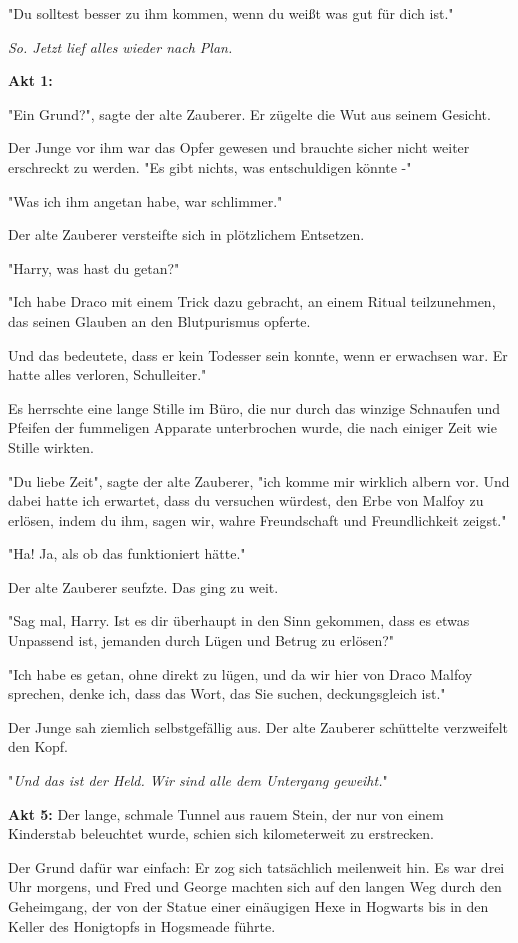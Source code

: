 {"Du solltest besser zu ihm kommen, wenn du weißt was gut für dich ist."

\emph{So. Jetzt lief alles wieder nach Plan.}

\textbf{Akt 1:}

"Ein Grund?", sagte der alte Zauberer. Er zügelte die Wut aus seinem Gesicht.

Der Junge vor ihm war das Opfer gewesen und brauchte sicher nicht weiter erschreckt zu werden. "Es gibt nichts, was entschuldigen könnte -"

"Was ich ihm angetan habe, war schlimmer."

Der alte Zauberer versteifte sich in plötzlichem Entsetzen.

"Harry, was hast du getan?"

"Ich habe Draco mit einem Trick dazu gebracht, an einem Ritual teilzunehmen, das seinen Glauben an den Blutpurismus opferte.

Und das bedeutete, dass er kein Todesser sein konnte, wenn er erwachsen war. Er hatte alles verloren, Schulleiter."

Es herrschte eine lange Stille im Büro, die nur durch das winzige Schnaufen und Pfeifen der fummeligen Apparate unterbrochen wurde, die nach einiger Zeit wie Stille wirkten.

"Du liebe Zeit", sagte der alte Zauberer, "ich komme mir wirklich albern vor. Und dabei hatte ich erwartet, dass du versuchen würdest, den Erbe von Malfoy zu erlösen, indem du ihm, sagen wir, wahre Freundschaft und Freundlichkeit zeigst."

"Ha! Ja, als ob das funktioniert hätte."

Der alte Zauberer seufzte. Das ging zu weit.

"Sag mal, Harry. Ist es dir überhaupt in den Sinn gekommen, dass es etwas Unpassend ist, jemanden durch Lügen und Betrug zu erlösen?"

"Ich habe es getan, ohne direkt zu lügen, und da wir hier von Draco Malfoy sprechen, denke ich, dass das Wort, das Sie suchen, deckungsgleich ist."

Der Junge sah ziemlich selbstgefällig aus. Der alte Zauberer schüttelte verzweifelt den Kopf.

"\emph{Und das ist der Held. Wir sind alle dem Untergang geweiht.}"

\textbf{Akt 5:} Der lange, schmale Tunnel aus rauem Stein, der nur von einem Kinderstab beleuchtet wurde, schien sich kilometerweit zu erstrecken.

Der Grund dafür war einfach: Er zog sich tatsächlich meilenweit hin. Es war drei Uhr morgens, und Fred und George machten sich auf den langen Weg durch den Geheimgang, der von der Statue einer einäugigen Hexe in Hogwarts bis in den Keller des Honigtopfs in Hogsmeade führte.

}
